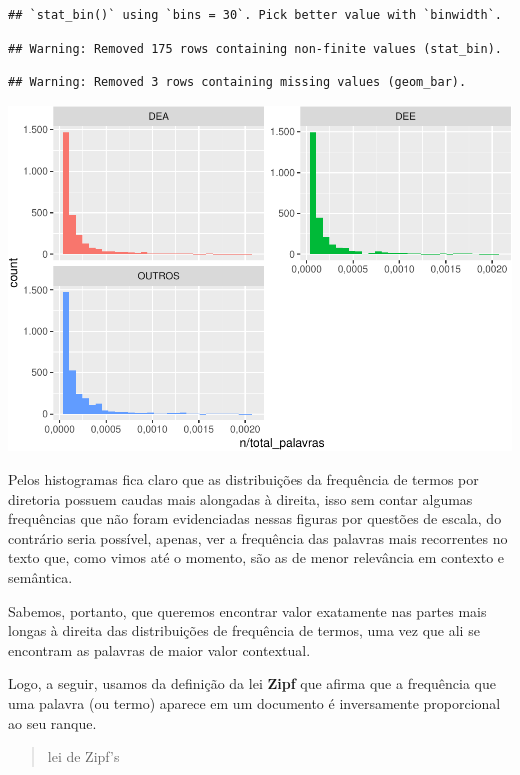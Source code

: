 \documentclass[]{article}
\begin{document}
\begin{verbatim}
## `stat_bin()` using `bins = 30`. Pick better value with `binwidth`.
\end{verbatim}

\begin{verbatim}
## Warning: Removed 175 rows containing non-finite values (stat_bin).
\end{verbatim}

\begin{verbatim}
## Warning: Removed 3 rows containing missing values (geom_bar).
\end{verbatim}

\includegraphics{markdown_v40_files/figure-latex/unnamed-chunk-27-1.pdf}

Pelos histogramas fica claro que as distribuições da frequência de
termos por diretoria possuem caudas mais alongadas à direita, isso sem
contar algumas frequências que não foram evidenciadas nessas figuras por
questões de escala, do contrário seria possível, apenas, ver a
frequência das palavras mais recorrentes no texto que, como vimos até o
momento, são as de menor relevância em contexto e semântica.

Sabemos, portanto, que queremos encontrar valor exatamente nas partes
mais longas à direita das distribuições de frequência de termos, uma vez
que ali se encontram as palavras de maior valor contextual.

Logo, a seguir, usamos da definição da lei \textbf{Zipf} que afirma que
a frequência que uma palavra (ou termo) aparece em um documento é
inversamente proporcional ao seu ranque.

\begin{quote}
lei de Zipf's
\end{quote}
\end{document}
